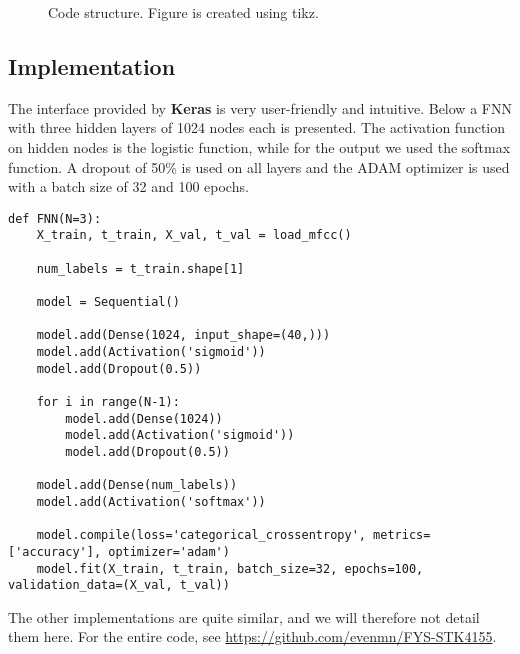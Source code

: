 \begin{figure} [H]
	\caption{Code structure. Figure is created using tikz. \cite{tikz}}
	\label{fig:code_structure}
\end{figure}

\subsection{Implementation}
The interface provided by \textbf{Keras} is very user-friendly and intuitive. Below a FNN with three hidden layers of 1024 nodes each is presented. The activation function on hidden nodes is the logistic function, while for the output we used the softmax function. A dropout of 50\% is used on all layers and the ADAM optimizer is used with a batch size of 32 and 100 epochs. 
\lstset{basicstyle=\scriptsize}
\begin{lstlisting}
def FNN(N=3):
    X_train, t_train, X_val, t_val = load_mfcc()

    num_labels = t_train.shape[1]

    model = Sequential()

    model.add(Dense(1024, input_shape=(40,)))
    model.add(Activation('sigmoid'))
    model.add(Dropout(0.5))

    for i in range(N-1):
        model.add(Dense(1024))
        model.add(Activation('sigmoid'))
        model.add(Dropout(0.5))

    model.add(Dense(num_labels))
    model.add(Activation('softmax'))

    model.compile(loss='categorical_crossentropy', metrics=['accuracy'], optimizer='adam')
    model.fit(X_train, t_train, batch_size=32, epochs=100, validation_data=(X_val, t_val))
\end{lstlisting}
The other implementations are quite similar, and we will therefore not detail them here. For the entire code, see \url{https://github.com/evenmn/FYS-STK4155}.